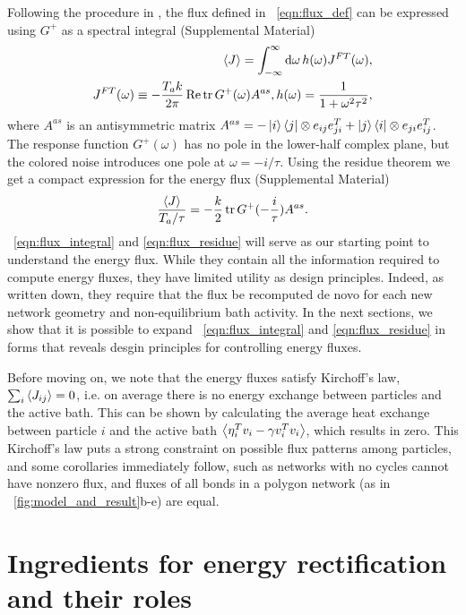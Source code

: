 \documentclass[
 preprint,
 preprintnumbers,
 amsmath,amssymb,
 aps,
 pre,
 longbibliography,
 superscriptaddress,
 10pt, twocolumn
]{revtex4-1}
\begin{document}
Following the procedure in \cite{Kundu2011LargeDeviations}, the flux defined in \eqnname~\eqref{eqn:flux_def} can be expressed using $G^+$ as a spectral integral (Supplemental Material)
\begin{align} \label{eqn:flux_integral}
    \expval{J} = \int_{-\infty}^\infty \dd{\omega} h(\omega) J^{FT}(\omega), \\
    J^{FT}(\omega) \equiv -\frac{T_a k}{2\pi} \Re \tr G^+(\omega)A^{as},
    h(\omega) = \frac{1}{1+\omega^2\tau^2},
\end{align}
where $A^{as}$ is an antisymmetric matrix
$A^{as} = -\ket{i}\bra{j} \otimes e_{ij}e_{ji}^T + \ket{j}\bra{i} \otimes e_{ji}e_{ij}^T$.
The response function $G^+(\omega)$ has no pole in the lower-half complex plane, but the colored noise introduces one pole at $\omega = -i/\tau$. Using the residue theorem we get a compact expression for the energy flux (Supplemental Material)
\begin{equation} \label{eqn:flux_residue}
    \frac{\expval{J}}{T_a/\tau} = -\frac{k}{2} \tr G^+(-\frac{i}{\tau})A^{as} .
\end{equation}
\eqnname~\eqref{eqn:flux_integral} and \eqref{eqn:flux_residue} will serve as our starting point to understand the energy flux. While they contain all the information required to compute energy fluxes, they have limited utility as design principles. Indeed, as written down, they require that the flux be recomputed de novo for each new network geometry and non-equilibrium bath activity. In the next sections, we show that it is possible to expand \eqnname~\eqref{eqn:flux_integral} and \eqref{eqn:flux_residue} in forms that reveals desgin principles for controlling energy fluxes.

Before moving on, we note that the energy fluxes satisfy Kirchoff's law, $\sum_i \expval{J_{ij}} = 0$, i.e. on average there is no energy exchange between particles and the active bath. This can be shown by calculating the average heat exchange between particle $i$ and the active bath $\expval{\eta_i^T v_i - \gamma v_i^T v_i}$, which results in zero.
This Kirchoff's law puts a strong constraint on possible flux patterns among particles, and some corollaries immediately follow, such as networks with no cycles cannot have nonzero flux, and fluxes of all bonds in a polygon network (as in \figurename~\ref{fig:model_and_result}b-e) are equal.


\section{Ingredients for energy rectification and their roles} \label{sec:fourier}
\end{document}
